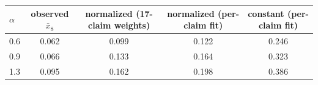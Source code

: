 \begin{tabular}{lcccc}
\toprule
$\alpha$ & observed $\bar x_8$ & normalized (17-claim weights) & normalized (per-claim fit) & constant (per-claim fit) \\
\midrule
0.6 & 0.062 & 0.099 & 0.122 & 0.246 \\
0.9 & 0.066 & 0.133 & 0.164 & 0.323 \\
1.3 & 0.095 & 0.162 & 0.198 & 0.386 \\
\bottomrule
\end{tabular}
